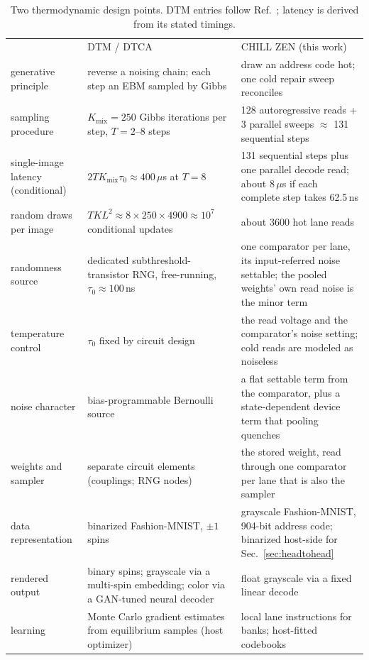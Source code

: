 \documentclass[reprint,amsmath,amssymb,aps,nofootinbib]{revtex4-2}
\begin{document}
\begin{table}
\caption{Two thermodynamic design points. DTM entries follow
Ref.~\cite{jelincic2025dtm}; latency is derived from its stated timings.
\label{tab:designpoint}}
\begin{ruledtabular}
\begin{tabular}{p{2.9cm}p{6.9cm}p{6.6cm}}
 & DTM / DTCA \cite{jelincic2025dtm} & CHILL ZEN (this work) \\
\colrule
generative principle & reverse a noising chain; each step an EBM
sampled by Gibbs & draw an address code hot; one cold repair sweep
reconciles \\
sampling procedure & $K_{\mathrm{mix}} = 250$ Gibbs iterations per
step, $T = 2$--$8$ steps & 128 autoregressive reads + 3 parallel
sweeps $\approx$ 131 sequential steps \\
single-image latency (conditional) &
$2 T K_{\mathrm{mix}}\tau_0 \approx 400\,\mu$s at $T=8$ &
131 sequential steps plus one parallel decode read;
about $8\,\mu$s if each complete step takes 62.5\,ns \\
random draws per image & $T K L^2 \approx 8 \times 250 \times 4900
\approx 10^{7}$ conditional updates & about 3600 hot lane reads \\
randomness source & dedicated subthreshold-transistor RNG,
free-running, $\tau_0 \approx 100$\,ns & one comparator per lane, its
input-referred noise settable; the pooled weights' own
read noise is the minor term \\
temperature control & $\tau_0$ fixed by circuit design & the read
voltage and the comparator's noise setting; cold reads are
modeled as noiseless \\
noise character & bias-programmable Bernoulli source & a flat settable
term from the comparator, plus a state-dependent device term that
pooling quenches \\
weights and sampler & separate circuit elements (couplings; RNG
nodes) & the stored weight, read through one comparator per lane that
is also the sampler \\
data representation & binarized Fashion-MNIST, $\pm1$ spins &
grayscale Fashion-MNIST, 904-bit address code; binarized host-side
for Sec.~\ref{sec:headtohead} \\
rendered output & binary spins; grayscale via a multi-spin embedding;
color via a GAN-tuned neural decoder & float grayscale via a fixed
linear decode \\
learning & Monte Carlo gradient estimates from equilibrium samples
(host optimizer) & local lane instructions for banks; host-fitted
codebooks \\
\end{tabular}
\end{ruledtabular}
\end{table}
\end{document}
